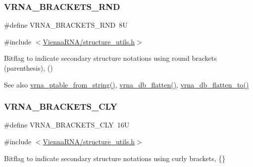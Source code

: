 \subsubsection{\texorpdfstring{V\+R\+N\+A\+\_\+\+B\+R\+A\+C\+K\+E\+T\+S\+\_\+\+R\+ND}{VRNA\_BRACKETS\_RND}}
{\footnotesize\ttfamily \#define V\+R\+N\+A\+\_\+\+B\+R\+A\+C\+K\+E\+T\+S\+\_\+\+R\+ND~8U}



{\ttfamily \#include $<$\mbox{\hyperlink{structure__utils_8h}{Vienna\+R\+N\+A/structure\+\_\+utils.\+h}}$>$}



Bitflag to indicate secondary structure notations using round brackets (parenthesis), {\ttfamily ()} 

\begin{DoxySeeAlso}{See also}
\mbox{\hyperlink{group__struct__utils_gac76c9ef3de507748fb0416a59323362b}{vrna\+\_\+ptable\+\_\+from\+\_\+string()}}, \mbox{\hyperlink{group__struct__utils_gae966b9f44168a4f4b39ca42ffb5f37b7}{vrna\+\_\+db\+\_\+flatten()}}, \mbox{\hyperlink{group__struct__utils_ga690425199c8b71545e7196e3af1436f8}{vrna\+\_\+db\+\_\+flatten\+\_\+to()}} 
\end{DoxySeeAlso}
\mbox{\label{group__struct__utils_gaf41be40e79cb756c4e0bb8edb4d803d2}} 
\subsubsection{\texorpdfstring{V\+R\+N\+A\+\_\+\+B\+R\+A\+C\+K\+E\+T\+S\+\_\+\+C\+LY}{VRNA\_BRACKETS\_CLY}}
{\footnotesize\ttfamily \#define V\+R\+N\+A\+\_\+\+B\+R\+A\+C\+K\+E\+T\+S\+\_\+\+C\+LY~16U}



{\ttfamily \#include $<$\mbox{\hyperlink{structure__utils_8h}{Vienna\+R\+N\+A/structure\+\_\+utils.\+h}}$>$}



Bitflag to indicate secondary structure notations using curly brackets, {\ttfamily \{\}} 

